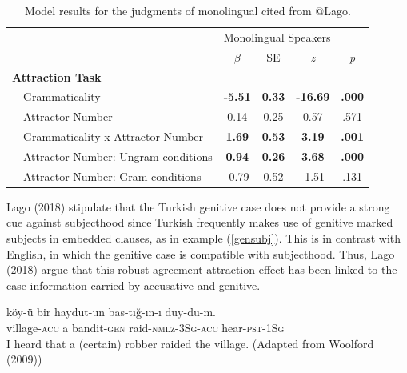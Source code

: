 \documentclass[doc]{apa6}
\begin{document}
\begin{table}[!hbt]
\centering
\begin{tabular}{llcccc}
\hline
    &                                        & \multicolumn{4}{l}{Monolingual Speakers}                                               \\ \cline{3-6} 
    &                                        & $\beta$        & SE            & \emph{z} & \emph{p} \\ \hline
\multicolumn{2}{l}{\textbf{Attraction Task}} &                &               &                           &                           \\
    & Grammaticality                         & \textbf{-5.51} & \textbf{0.33} & \textbf{-16.69}           & \textbf{.000}             \\
    & Attractor Number                       & 0.14           & 0.25          & 0.57                      & .571                      \\
    & Grammaticality x Attractor Number      & \textbf{1.69}  & \textbf{0.53} & \textbf{3.19}             & \textbf{.001}             \\
    & Attractor Number: Ungram conditions    & \textbf{0.94}  & \textbf{0.26} & \textbf{3.68}             & \textbf{.000}             \\
    & Attractor Number: Gram conditions      & -0.79          & 0.52          & -1.51                     & .131                      \\ \hline
\end{tabular}
\caption{Model results for the judgments of monolingual cited from @Lago.}
\label{lagomodel}
\end{table}

Lago (2018) stipulate that the Turkish genitive case does not provide a
strong cue against subjecthood since Turkish frequently makes use of
genitive marked subjects in embedded clauses, as in example
(\ref{gensubj}). This is in contrast with English, in which the genitive
case is compatible with subjecthood. Thus, Lago (2018) argue that this
robust agreement attraction effect has been linked to the case
information carried by accusative and genitive.

\begin{exe}
\ex \label{gensubj}
\gll k\"{o}y-\"{u} bir haydut-un bas-t{\i}\u{g}-{\i}n-{\i} duy-du-m.\\
village-\textsc{acc} a bandit-\textsc{gen} raid-\textsc{nmlz}-\textsc{3Sg}-\textsc{acc} hear-\textsc{pst}-\textsc{1Sg}\\
\glt I heard that a (certain) robber raided the village. (Adapted from Woolford (2009))
\end{exe}
\end{document}
